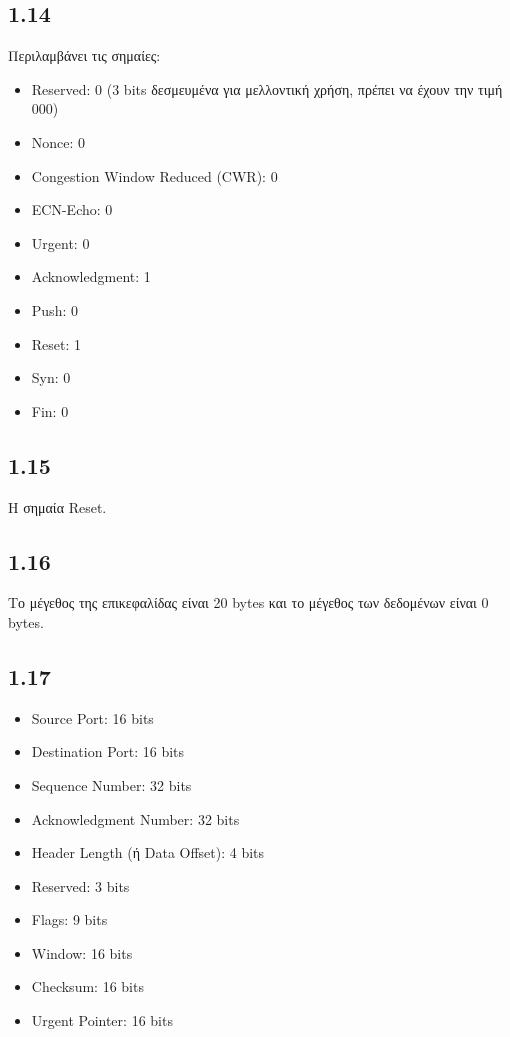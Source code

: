 		\subsection*{1.14} 
			Περιλαμβάνει τις σημαίες: 
			
			\begin{itemize}
				\item Reserved: 0 (3 bits δεσμευμένα για μελλοντική χρήση, πρέπει να έχουν την τιμή 000)
				\item Nonce: 0
				\item Congestion Window Reduced (CWR): 0
				\item ECN-Echo: 0
				\item Urgent: 0
				\item Acknowledgment: 1
				\item Push: 0
				\item Reset: 1
				\item Syn: 0
				\item Fin: 0
			\end{itemize}
			
		
		\subsection*{1.15} 
			Η σημαία Reset.
		
		\subsection*{1.16} 
			Το μέγεθος της επικεφαλίδας είναι 20 bytes και το μέγεθος των δεδομένων είναι 0 bytes.
		
		\subsection*{1.17} 
			\begin{itemize}
				\item Source Port: 16 bits
				\item Destination Port: 16 bits
				\item Sequence Number: 32 bits
				\item Acknowledgment Number: 32 bits
				\item Header Length (ή Data Offset): 4 bits
				\item Reserved: 3 bits
				\item Flags: 9 bits
				\item Window: 16 bits
				\item Checksum: 16 bits
				\item Urgent Pointer: 16 bits 
			\end{itemize}
		
